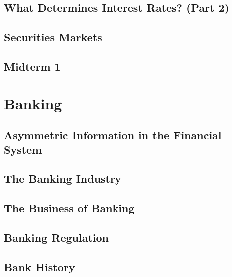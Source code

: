 \documentclass[
]{book}
\begin{document}
\hypertarget{what-determines-interest-rates-part-2}{%
\chapter{What Determines Interest Rates? (Part 2)}\label{what-determines-interest-rates-part-2}}

\hypertarget{securities-markets}{%
\chapter{Securities Markets}\label{securities-markets}}

\hypertarget{midterm-1}{%
\chapter{\texorpdfstring{\textbf{Midterm 1}}{Midterm 1}}\label{midterm-1}}

\hypertarget{part-banking}{%
\part{Banking}\label{part-banking}}

\hypertarget{asymmetric-information-in-the-financial-system}{%
\chapter{Asymmetric Information in the Financial System}\label{asymmetric-information-in-the-financial-system}}

\hypertarget{the-banking-industry}{%
\chapter{The Banking Industry}\label{the-banking-industry}}

\hypertarget{the-business-of-banking}{%
\chapter{The Business of Banking}\label{the-business-of-banking}}

\hypertarget{banking-regulation}{%
\chapter{Banking Regulation}\label{banking-regulation}}

\hypertarget{bank-history}{%
\chapter{Bank History}\label{bank-history}}
\end{document}
